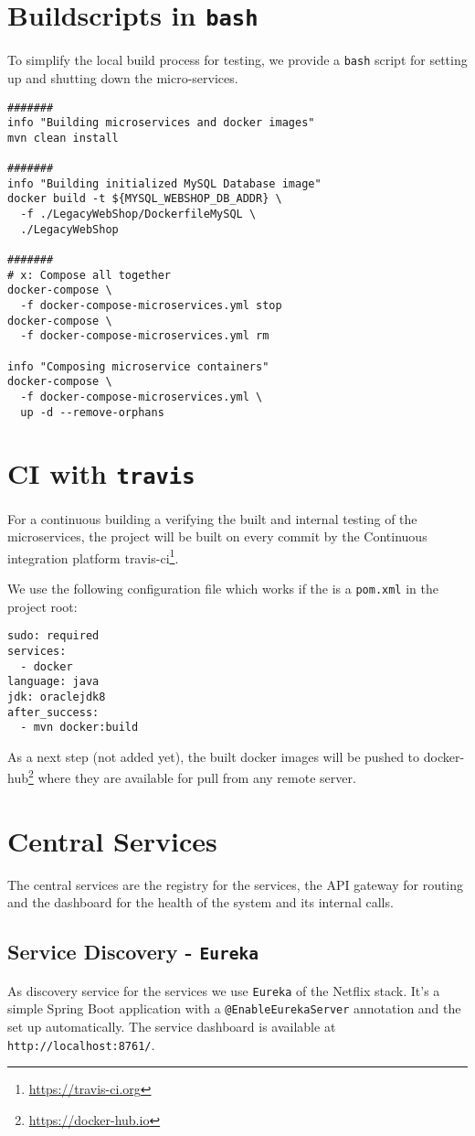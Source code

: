 \documentclass[11pt]{article}
\begin{document}
	\section{Buildscripts in \texttt{bash}}
	To simplify the local build process for testing, we provide a \texttt{bash} script for setting up and shutting down the micro-services.
	\begin{lstlisting}
#######
info "Building microservices and docker images"
mvn clean install 

#######
info "Building initialized MySQL Database image"
docker build -t ${MYSQL_WEBSHOP_DB_ADDR} \ 
  -f ./LegacyWebShop/DockerfileMySQL \
  ./LegacyWebShop

#######
# x: Compose all together
docker-compose \
  -f docker-compose-microservices.yml stop
docker-compose \
  -f docker-compose-microservices.yml rm

info "Composing microservice containers"
docker-compose \
  -f docker-compose-microservices.yml \
  up -d --remove-orphans	
\end{lstlisting}
	\section{CI with \texttt{travis}}
	For a continuous building a verifying the built and internal testing of the microservices, the project will be built on every commit by the Continuous integration platform travis-ci\footnote{\url{https://travis-ci.org}}.
	
	We use the following configuration file which works if the is a \texttt{pom.xml} in the project root:
	\begin{lstlisting}
sudo: required
services:
  - docker
language: java
jdk: oraclejdk8
after_success:
  - mvn docker:build
	\end{lstlisting}
	
	As a next step (not added yet), the built docker images will be pushed to docker-hub\footnote{\url{https://docker-hub.io}} where they are available for pull from any remote server.
	
	\section{Central Services}
	The central services are the registry for the services, the API gateway for routing and the dashboard for the health of the system and its internal calls.	
	\subsection{Service Discovery - \texttt{Eureka}}
	As discovery service for the services we use \texttt{Eureka} of the Netflix stack. It's a simple Spring Boot application with a \texttt{@EnableEurekaServer} annotation and the set up automatically. The service dashboard is available at \texttt{http://localhost:8761/}.
\end{document}
